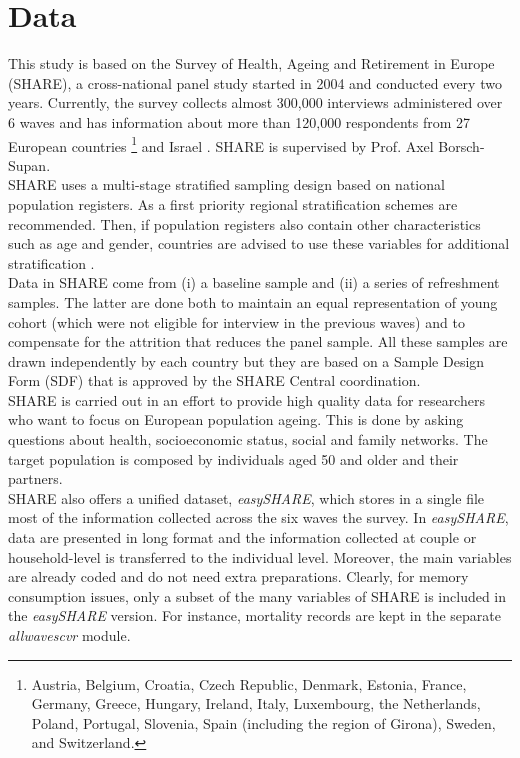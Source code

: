




\section{Data}

This study is based on the Survey of Health, Ageing and Retirement in Europe (SHARE), a cross-national panel study started in 2004 and conducted every two years. Currently, the survey collects almost 300,000 interviews administered over 6 waves and has information about more than 120,000 respondents from 27 European countries \footnote{Austria, Belgium, Croatia, Czech Republic, Denmark, Estonia, France, Germany,
Greece, Hungary, Ireland, Italy, Luxembourg, the Netherlands, Poland, Portugal, Slovenia,
Spain (including the region of Girona), Sweden, and Switzerland.} and Israel \citep{Bergmann2017}.
SHARE is supervised by Prof. Axel Borsch-Supan.\\



SHARE uses a multi-stage stratified sampling design based on national population registers. As a first priority 
regional stratification schemes are recommended. Then, if population registers also contain other characteristics such as age and gender, countries are advised to use these variables for additional stratification \citep{Bergmann2017}. \\
Data in SHARE come from (i) a baseline sample and (ii) a series of refreshment samples. The latter are done both to maintain an equal representation of young cohort (which were not eligible for interview in the previous waves) and to compensate for the attrition that reduces the panel sample. All these samples are drawn independently by each country but they are based on a Sample Design Form (SDF) that is approved by the SHARE Central coordination. \\



SHARE is carried out in an effort to provide high quality data for researchers who want to focus on European population ageing. This is done by asking questions about health, socioeconomic status, social and family networks. The target population is composed by individuals aged 50 and older and their partners.\\ 

SHARE also offers a unified dataset, \textit{easySHARE}, which stores in a single file most of the information collected across the six waves the survey. In \textit{easySHARE}, data are presented in long format and the information collected at couple or household-level is transferred to the individual level. Moreover, the main variables are already coded and do not need extra preparations.
Clearly, for memory consumption issues, only a subset of the many variables of SHARE is included in  the \textit{easySHARE} version. For instance, mortality records are kept in the separate \textit{allwaves\textunderscore cv\textunderscore r}  module.


